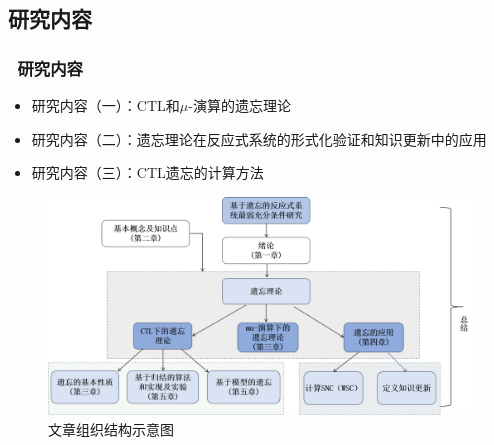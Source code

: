 \documentclass[aspectratio=1610, 9pt, CJK]{beamer}
\begin{document}
	\subsection{研究内容}

\begin{frame}
	\frametitle{~研究内容}
		\begin{itemize}
		\item  研究内容（一）：CTL和$\mu$-演算的遗忘理论
		\item 研究内容（二）：遗忘理论在反应式系统的形式化验证和知识更新中的应用
		\item 研究内容（三）：CTL遗忘的计算方法
	\end{itemize}
	\begin{figure}
		\includegraphics[scale=0.3]{figures/zuzhi}
		\caption{文章组织结构示意图}
	\end{figure}
\end{frame}
\end{document}
